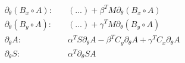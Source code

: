 \begin{align*}
\partial_\theta \left( B_x \circ A \right):& \quad \left(...\right) + \beta^T M \partial_\theta \left( B_x \circ A \right) \\
\partial_\theta \left( B_y \circ A \right):& \quad \left(...\right) + \gamma^T M \partial_\theta \left( B_y \circ A \right) \\
\partial_\theta A:& \quad \alpha^T S \partial_\theta A - \beta^T C_y \partial_\theta A + \gamma^T C_x \partial_\theta A \\
\partial_\theta S:& \quad \alpha^T \partial_\theta S A
\end{align*}

